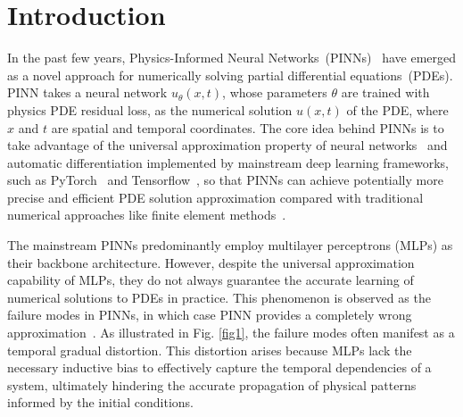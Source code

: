 \section{Introduction}

In the past few years, Physics-Informed Neural Networks~(PINNs)~\cite{raissi2019physics} have emerged as a novel approach for numerically solving partial differential equations~(PDEs). 
    PINN takes a neural network $u_{\theta}(x,t)$, whose parameters $\theta$ are trained with physics PDE residual loss, as the numerical solution $u(x,t)$ of the PDE, where $x$ and $t$ are spatial and temporal coordinates. 
        The core idea behind PINNs is to take advantage of the universal approximation property of neural networks~\cite{hornik1989multilayer} and automatic differentiation implemented by mainstream deep learning frameworks, such as PyTorch~\cite{paszke2019pytorch} and Tensorflow~\cite{abadi2016tensorflow}, 
            so that PINNs can achieve potentially more precise and efficient PDE solution approximation compared with traditional numerical approaches like finite element methods~\cite{reddy1993introduction}.




The mainstream PINNs predominantly employ multilayer perceptrons (MLPs) as their backbone architecture. However, despite the universal approximation capability of MLPs, they do not always guarantee the accurate learning of numerical solutions to PDEs in practice. This phenomenon is observed as the failure modes in PINNs, in which case PINN provides a completely wrong approximation~\cite{krishnapriyan2021characterizing}. As illustrated in Fig. \ref{fig1}, the failure modes often manifest as a temporal gradual distortion. This distortion arises because MLPs lack the necessary inductive bias to effectively capture the temporal dependencies of a system, ultimately hindering the accurate propagation of physical patterns informed by the initial conditions.

